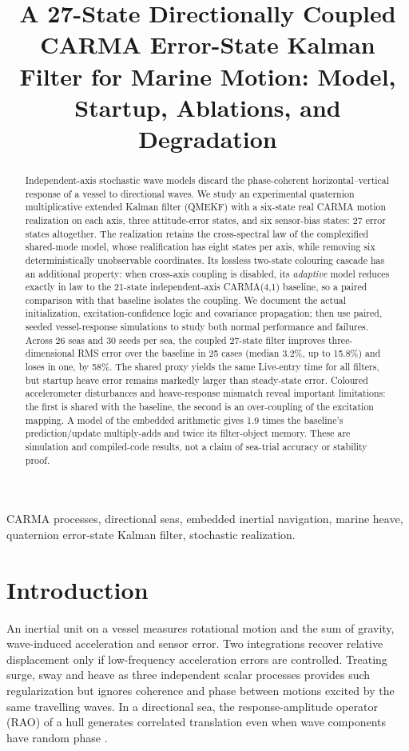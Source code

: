 \documentclass[conference]{IEEEtran}
\title{A 27-State Directionally Coupled CARMA Error-State Kalman Filter for
Marine Motion: Model, Startup, Ablations, and Degradation}
\author{\IEEEauthorblockN{Mikhail S. Grushinskiy}
\IEEEauthorblockA{Independent Researcher, Bareboat Necessities Project, USA\\
mgrouch@users.github.com}}
\begin{document}
\maketitle

\begin{abstract}
Independent-axis stochastic wave models discard the phase-coherent
horizontal--vertical response of a vessel to directional waves. We study an
experimental quaternion multiplicative extended Kalman filter (QMEKF) with
a six-state real CARMA motion realization on each axis, three attitude-error
states, and six sensor-bias states: 27 error states altogether. The
realization retains the cross-spectral law of the complexified shared-mode
model, whose realification has eight states per axis, while removing six
deterministically unobservable coordinates. Its lossless two-state colouring
cascade has an additional property: when cross-axis coupling is disabled,
its \emph{adaptive} model reduces exactly in law to the 21-state
independent-axis CARMA(4,1) baseline, so a paired comparison with that
baseline isolates the coupling.
We document the actual initialization, excitation-confidence logic and
covariance propagation; then use paired, seeded vessel-response simulations
to study both normal performance and failures. Across 26 seas and 30 seeds
per sea, the coupled 27-state filter improves three-dimensional RMS error
over the baseline in 25 cases (median 3.2\%, up to 15.8\%) and loses in
one, by 58\%.
The shared proxy yields the same Live-entry time for all filters, but
startup heave error remains markedly larger than steady-state error.
Coloured accelerometer disturbances and heave-response mismatch reveal
important limitations: the first is shared with the baseline, the second is
an over-coupling of the excitation mapping. A model of the embedded
arithmetic gives 1.9 times the baseline's prediction/update multiply-adds and
twice its filter-object memory. These are simulation and
compiled-code results, not a claim of sea-trial accuracy or stability proof.
\end{abstract}

\begin{IEEEkeywords}
CARMA processes, directional seas, embedded inertial navigation, marine
heave, quaternion error-state Kalman filter, stochastic realization.
\end{IEEEkeywords}

\section{Introduction}
\label{sec:intro}
An inertial unit on a vessel measures rotational motion and the sum of
gravity, wave-induced acceleration and sensor error. Two integrations
recover relative displacement only if low-frequency acceleration errors
are controlled. Treating surge, sway and heave as three independent scalar
processes provides such regularization but ignores coherence and phase
between motions excited by the same travelling waves. In a directional
sea, the response-amplitude operator (RAO) of a hull generates correlated
translation even when wave components have random phase \cite{jonswap73}.
\end{document}
